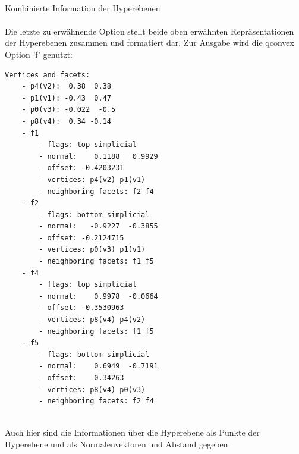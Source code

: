 \documentclass[12pt]{scrartcl}
\begin{document}
\ \\
\underline{Kombinierte Information der Hyperebenen}\\~\\
Die letzte zu erwähnende Option stellt beide oben erwähnten Repräsentationen der Hyperebenen zusammen und formatiert dar. Zur Ausgabe wird die qconvex Option 'f' genutzt:\\

\begin{lstlisting}[style=Terminal, caption={Ausgabe von qconvex mit Option 'f'},captionpos=b]
    Vertices and facets:
    - p4(v2):  0.38  0.38
    - p1(v1): -0.43  0.47
    - p0(v3): -0.022  -0.5
    - p8(v4):  0.34 -0.14
    - f1
        - flags: top simplicial
        - normal:    0.1188   0.9929
        - offset: -0.4203231
        - vertices: p4(v2) p1(v1)
        - neighboring facets: f2 f4
    - f2
        - flags: bottom simplicial
        - normal:   -0.9227  -0.3855
        - offset: -0.2124715
        - vertices: p0(v3) p1(v1)
        - neighboring facets: f1 f5
    - f4
        - flags: top simplicial
        - normal:    0.9978  -0.0664
        - offset: -0.3530963
        - vertices: p8(v4) p4(v2)
        - neighboring facets: f1 f5
    - f5
        - flags: bottom simplicial
        - normal:    0.6949  -0.7191
        - offset:   -0.34263
        - vertices: p8(v4) p0(v3)
        - neighboring facets: f2 f4
\end{lstlisting}
\ \\
Auch hier sind die Informationen über die Hyperebene als Punkte der Hyperebene und als Normalenvektoren und Abstand gegeben.
\end{document}
